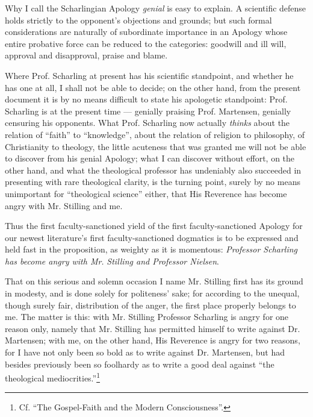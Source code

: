 \documentclass[12pt,a4paper,openany]{book}
\newcommand{\opage}[1]{\marginnote{\footnotesize\textit{[#1]}}}
\begin{document}
Why I call the Scharlingian Apology \emph{genial}
is easy to explain. A scientific defense
holds strictly to the opponent's objections and grounds;
but such formal considerations are naturally of subordinate
importance in an Apology whose entire probative force can
be reduced to the categories: goodwill and ill will, approval
and disapproval, praise and blame.

Where Prof. Scharling at present has his scientific
standpoint, and whether he has one at all, I shall
not be able to decide; on the other hand, from the present
\setcounter{footnote}{0}%
\opage{4}document it is by no means difficult to state his apologetic
standpoint: Prof. Scharling is at the present time ---
genially praising Prof. Martensen, genially censuring
his opponents. What Prof. Scharling now actually
\emph{thinks} about the relation of ``faith'' to ``knowledge'', about the relation of religion
to philosophy, of Christianity to theology,
the little acuteness that was granted me
will not be able to discover from his genial Apology;
what I can discover without effort, on the other hand, and what
the theological professor has undeniably also succeeded
in presenting with rare theological clarity, is the
turning point, surely by no means unimportant for ``theological science'' either,
that His Reverence has become angry
with Mr. Stilling and me.

Thus the first faculty-sanctioned yield of
the first faculty-sanctioned Apology for our newest literature's
first faculty-sanctioned dogmatics is to be expressed and
held fast in the proposition, as weighty as it is momentous: \emph{Professor Scharling has become angry with Mr.}
\emph{Stilling and Professor Nielsen}.

That on this serious and solemn occasion I
name Mr. Stilling first has its ground
in modesty, and is done solely for politeness' sake; for
according to the unequal, though surely fair, distribution of the anger,
the first place properly belongs to me.
The matter is this: with Mr. Stilling Professor
Scharling is angry for one reason only, namely that Mr.
Stilling has permitted himself to write against Dr.
Martensen; with me, on the other hand, His Reverence is angry
for two reasons, for I have not only been so bold
as to write against Dr. Martensen, but had besides previously
\setcounter{footnote}{0}%
\opage{5}been so foolhardy as to write a good deal against ``the theological
mediocrities.''\footnote[1]{Cf. ``The Gospel-Faith and the Modern Consciousness''.}
\end{document}
